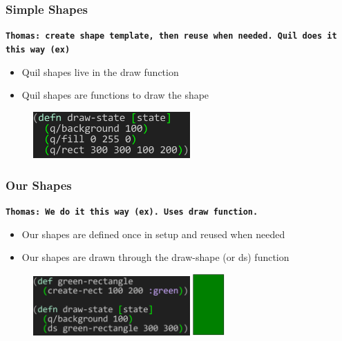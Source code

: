 \documentclass{beamer}
\newcommand{\comment}[1]{{\bf \tt  {#1}}}
\newcommand{\thcomment}[1]{\textcolor{BestBlue}{\comment{Thomas: {#1}}}}
\begin{document}
\begin{frame}


\frametitle{Simple Shapes}
\thcomment{create shape template, then reuse when needed. Quil does it this way (ex)}
	\begin{itemize}
		\item Quil shapes live in the draw function
		\item Quil shapes are functions to draw the shape
	\end{itemize}
	\begin{figure}
		\includegraphics[width=6cm]{PresentationImages/quilGreenRect.png}
	\end{figure}
\end{frame}

\begin{frame}
\frametitle{Our Shapes}
\thcomment{We do it this way (ex). Uses draw function.}
	\begin{itemize}
		\item Our shapes are defined once in setup and reused when needed
		\item Our shapes are drawn through the draw-shape (or ds) function
	\end{itemize}
	\begin{figure}
		\includegraphics[width=6cm]{PresentationImages/fcsGreenRect.png}
		\hspace{1cm}
		\includegraphics[width=1.2cm]{PresentationImages/greenRectangle.png}
	\end{figure}
\end{frame}
\end{document}

